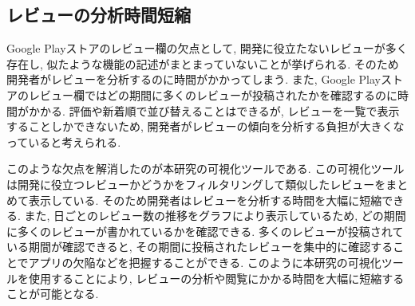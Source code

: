 



\subsection{レビューの分析時間短縮}
Google Playストアのレビュー欄の欠点として, 開発に役立たないレビューが多く存在し, 似たような機能の記述がまとまっていないことが挙げられる. そのため開発者がレビューを分析するのに時間がかかってしまう. 
また, Google Playストアのレビュー欄ではどの期間に多くのレビューが投稿されたかを確認するのに時間がかかる. 評価や新着順で並び替えることはできるが, レビューを一覧で表示することしかできないため, 開発者がレビューの傾向を分析する負担が大きくなっていると考えられる. 

このような欠点を解消したのが本研究の可視化ツールである. この可視化ツールは開発に役立つレビューかどうかをフィルタリングして類似したレビューをまとめて表示している. そのため開発者はレビューを分析する時間を大幅に短縮できる. 
また, 日ごとのレビュー数の推移をグラフにより表示しているため, どの期間に多くのレビューが書かれているかを確認できる. 
多くのレビューが投稿されている期間が確認できると, その期間に投稿されたレビューを集中的に確認することでアプリの欠陥などを把握することができる. 
このように本研究の可視化ツールを使用することにより, レビューの分析や閲覧にかかる時間を大幅に短縮することが可能となる. 

